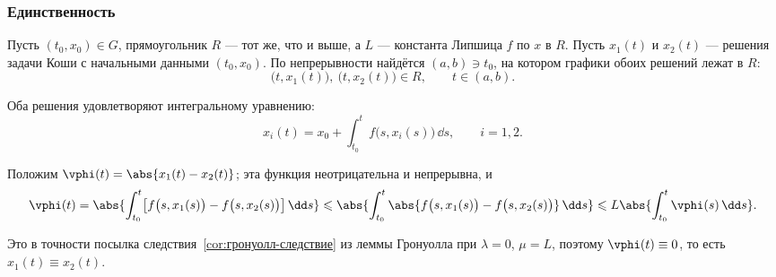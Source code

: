 \subsubsection*{Единственность}

Пусть $(t_0,x_0) \in G$, прямоугольник $R$ --- тот же, что и выше, а $L$ ---
константа Липшица $f$ по $x$ в $R$. Пусть $x_1(t)$ и $x_2(t)$ --- решения
задачи Коши с начальными данными $(t_0,x_0)$. По непрерывности найдётся
$(a,b) \ni t_0$, на котором графики обоих решений лежат в $R$:
\[
\bigl(t, x_1(t)\bigr),\ \bigl(t, x_2(t)\bigr) \in R,
\qquad t \in (a,b).
\]

Оба решения удовлетворяют интегральному уравнению:
\[
x_i(t) = x_0 + \int_{t_0}^{t} f\bigl(s, x_i(s)\bigr)\,\dd s,
\qquad i = 1,2 .
\]

Положим $\vphi(t) = \abs{x_1(t) - x_2(t)}$; эта функция неотрицательна и
непрерывна, и
\[
\vphi(t)
= \abs{\int_{t_0}^{t} \bigl[f\bigl(s, x_1(s)\bigr)
- f\bigl(s, x_2(s)\bigr)\bigr]\,\dd s}
\leqslant \abs{\int_{t_0}^{t} \abs{f\bigl(s, x_1(s)\bigr)
- f\bigl(s, x_2(s)\bigr)}\,\dd s}
\leqslant L\abs{\int_{t_0}^{t} \vphi(s)\,\dd s} .
\]

Это в точности посылка следствия~\ref{cor:гронуолл-следствие} из леммы
Гронуолла при $\lambda = 0$, $\mu = L$, поэтому $\vphi(t) \equiv 0$, то есть
$x_1(t) \equiv x_2(t)$.



